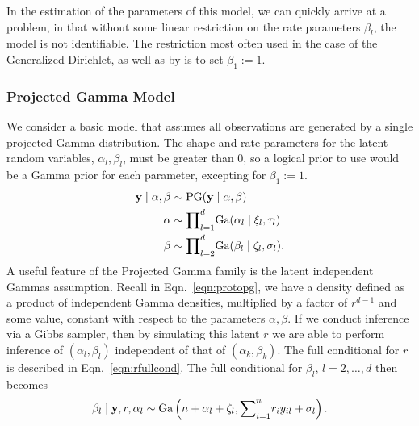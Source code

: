 In the estimation of the parameters of this model, we can quickly arrive at a problem, in that
  without some linear restriction on the rate parameters $\beta_l$, the model is not identifiable.
  The restriction most often used in the case of the Generalized Dirichlet, as well as by
  \cite{nunez2019} is to set $\beta_1 := 1$.

\subsubsection{Projected Gamma Model}
We consider a basic model that assumes all observations are generated by a single projected Gamma
  distribution.  The shape and rate parameters for the latent  random variables,
  $\alpha_l,\beta_l$, must be greater than 0, so a logical prior to use would be a Gamma prior for
  each parameter, excepting for $\beta_1 := 1$.
  \begin{equation}
    \label{eqn:vanillap}
    \begin{aligned}
      {\bf y}\mid\alpha,\beta &\sim \text{PG}({\bf y}\mid\alpha,\beta)\\
      {\bf \alpha} &\sim {\small \prod}_{l = 1}^d \text{Ga}(\alpha_l \mid \xi_l,\tau_l)\\
      {\bf \beta} &\sim {\small \prod}_{l = 2}^d \text{Ga}(\beta_l\mid \zeta_l,\sigma_l).
    \end{aligned}
  \end{equation}
  A useful feature of the Projected Gamma family is the latent independent Gammas assumption.  Recall
  in Eqn.~\ref{eqn:protopg}, we have a density defined as a product of independent Gamma densities,
  multiplied by a factor of $r^{d-1}$ and some value, constant with respect to the parameters
  $\alpha,\beta$.  If we conduct inference via a Gibbs sampler, then by simulating this latent $r$
  we are able to perform inference of $(\alpha_l,\beta_l)$ independent of that of $(\alpha_k,\beta_k)$.
  The full conditional for $r$ is described in Eqn.~\ref{eqn:rfullcond}.  The full conditional for
  $\beta_l$, $l = 2,\ldots,d$ then becomes
  \begin{equation}
    \label{eqn:betafc}
    \beta_l\mid {\bf y}, r, \alpha_l \sim \text{Ga}\left(n + \alpha_l + \zeta_l,
                                      {\small \sum}_{i = 1}^nr_iy_{il} + \sigma_l\right).
  \end{equation}

